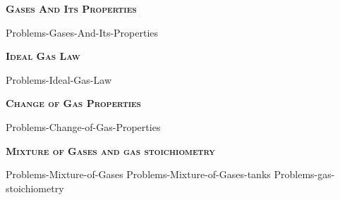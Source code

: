 \documentclass[main.tex]{subfiles}
\newcommand\chapterlabel{Ch-Gas}
\begin{document}
\newpage
\setdoublesep{0.35700 em}  %
\setatomsep{1.78500 em}    %
\setbondoffset{0.18265 em} %
\renewcommand{\bondwidth}{0.06642 em} %
\setbondstyle{line width = \bondwidth}
\fancyhfoffset[E,O]{0pt}
\setlength{\columnsep}{30pt}
\begin{conclusion}
\end{conclusion}
\begin{multicols*}{2}\setcounter{numA}{1}

{\raggedright\textsc{\textbf{Gases And Its Properties }}\par}
{Problems-Gases-And-Its-Properties}

\iftoggle{chem121}{}{
{Problems-Measuring-pressure}
}

{\raggedright\textsc{\textbf{Ideal Gas Law }}\par}
{Problems-Ideal-Gas-Law }
{\raggedright\textsc{\textbf{Change of Gas Properties }}\par}
{Problems-Change-of-Gas-Properties}
{\raggedright\textsc{\textbf{Mixture of Gases and gas stoichiometry }}\par}
{Problems-Mixture-of-Gases}
{Problems-Mixture-of-Gases-tanks}
{Problems-gas-stoichiometry}
 
\iftoggle{chem121}{}{
{\raggedright\textsc{\textbf{Real gases and the kinetic molecular theory of gases }}\par}
{Problems-Real-gases-and-the-kinetic-molecular-theory-of-gases}
\clearpage\thispagestyle{empty}\mbox{}\clearpage

}
\end{multicols*} \iftoggle{showfinalanswers}{
\newpage\fancyhfoffset[E,O]{0pt}
\begin{answerbox}
\begin{answersenvironment}
 \begin{localsize}{10}
{ \checkoddpage\ifoddpage    \else   \clearpage\thispagestyle{empty}\mbox{}\clearpage\fi
\Large \bf Answers}
\SetupExSheets{ headings = inline-nr , counter-format = qu) ,}
\printsolutions 
  \vspace{20cm}
 \end{localsize}
 \end{answersenvironment}
\end{answerbox}
}{}
\checkoddpage\ifoddpage   \clearpage\thispagestyle{empty}\mbox{}\clearpage \else   \fi
\end{document}
